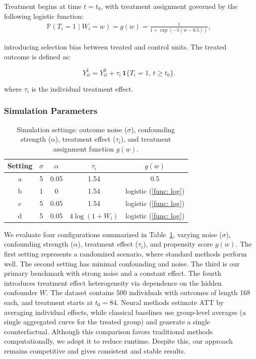 \documentclass[10pt]{article} %
\begin{document}
Treatment begins at time \( t = t_0 \), with treatment assignment governed by the following logistic function:
\begin{align}
   \mathbb P(T_i= 1 \mid W_i = w) = g(w) = \frac{1}{1 + \exp(-5(w - 0.5))},
\label{func: log}
\end{align}

introducing selection bias between treated and control units. The treated outcome is defined as:

\[
Y^1_{it} = Y^0_{it} + \tau_i\, \mathbf{1}\{T_i = 1,\, t \geq t_0\}.
\]

where \(\tau_i\) is the individual treatment effect.
\subsubsection*{Simulation Parameters}

\begin{table}[H]
    \centering
    \begin{tabular}{|c|c|c|c|c|}
    \toprule
       Setting&$\sigma$  & $\alpha$ & $\tau_i$ & $g(w)$  \\
       \hline
       a&5 & 0.05 & 1.54 & 0.5 \\
        b&1 & 0 & 1.54 & logistic (\ref{func: log}) \\
        
        c&5 & 0.05 & 1.54 & logistic (\ref{func: log}) \\
        d&5 & 0.05 & $4 \log(1 + W_i)$ & logistic (\ref{func: log})\\
    \bottomrule
    \end{tabular}
    \caption{Simulation settings: outcome noise (\(\sigma\)), confounding strength (\(\alpha\)), treatment effect (\(\tau_i\)), and treatment assignment function \(g(w)\).}
    \label{tab:simulation_params}
\end{table}
We evaluate four configurations summarized in Table~\ref{tab:simulation_params}, varying noise (\(\sigma\)), confounding strength (\(\alpha\)), treatment effect (\(\tau_i\)), and propensity score \(g(w)\).
The first setting represents a randomized scenario, where standard methods perform well.
The second setting has minimal confounding and noise.  The third is our primary benchmark with strong noise and a constant effect. The fourth introduces treatment effect heterogeneity via dependence on the hidden confounder \(W\). The dataset contains 500 individuals with outcomes of length 168 each, and treatment starts at $t_0 = 84$.
Neural methods estimate ATT by averaging individual effects, while classical baselines use group-level averages (a single aggregated curve for the treated group) and generate a single counterfactual. Although this comparison favors traditional methods computationally, we adopt it to reduce runtime. Despite this, our approach remains competitive and gives consistent and stable results.
\end{document}
